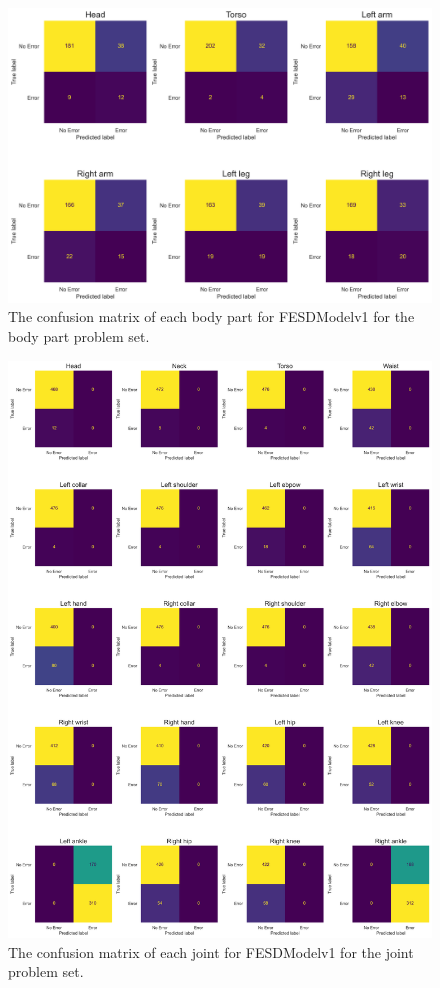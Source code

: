 \begin{figure}[!htbp]
  \centering
  \includegraphics[width=.8\linewidth]{figures/Results/v1/confusion/body_parts_part.png}
  \caption[Confusion matrix of FESDModelv1 for each Body Part]{The confusion matrix of each body part for FESDModelv1 for the body part problem set.}
  \label{fig:conf_v1_bps}
\end{figure}


\begin{figure}[!htbp]
  \centering
  \includegraphics[width=.8\linewidth]{figures/Results/v1/confusion/joints_joint.png}
  \caption[Confusion matrix of FESDModelv1 for each Joint]{The confusion matrix of each joint for FESDModelv1 for the joint problem set.}
  \label{fig:conf_v1_jts}
\end{figure}

